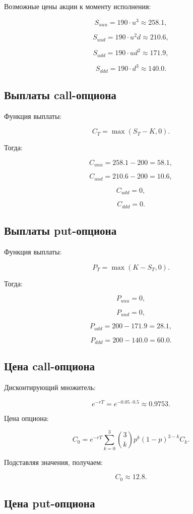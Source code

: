 Возможные цены акции к моменту исполнения:

\[
S_{uuu}=190\cdot u^3\approx258.1,
\]

\[
S_{uud}=190\cdot u^2d\approx210.6,
\]

\[
S_{udd}=190\cdot ud^2\approx171.9,
\]

\[
S_{ddd}=190\cdot d^3\approx140.0.
\]

\subsection*{Выплаты call-опциона}

Функция выплаты:

\[
C_T=\max(S_T-K,0).
\]

Тогда:

\[
C_{uuu}=258.1-200=58.1,
\]

\[
C_{uud}=210.6-200=10.6,
\]

\[
C_{udd}=0,
\]

\[
C_{ddd}=0.
\]

\subsection*{Выплаты put-опциона}

Функция выплаты:

\[
P_T=\max(K-S_T,0).
\]

Тогда:

\[
P_{uuu}=0,
\]

\[
P_{uud}=0,
\]

\[
P_{udd}=200-171.9=28.1,
\]

\[
P_{ddd}=200-140.0=60.0.
\]

\subsection*{Цена call-опциона}

Дисконтирующий множитель:

\[
e^{-rT}=e^{-0.05\cdot0.5}\approx0.9753.
\]

Цена опциона:

\[
C_0=
e^{-rT}
\sum_{k=0}^{3}
\binom{3}{k}
p^k(1-p)^{3-k}C_k.
\]

Подставляя значения, получаем:

\[
C_0\approx12.8.
\]

\subsection*{Цена put-опциона}

